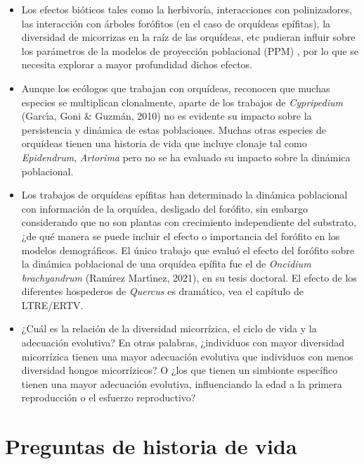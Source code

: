 \documentclass[
  12pt,
  letterpaper,
]{book}
\begin{document}
\begin{itemize}
  sobre orquídeas es un tema que merece atención. Por ejemplo ¿Cuál es
  el efecto de los patrones de variación abiótica sobre la persistencia
  de las poblaciones y su dinámica a largo plazo?
\item
  Los efectos bióticos tales como la herbivoría, interacciones con
  polinizadores, las interacción con árboles forófitos (en el caso de
  orquídeas epífitas), la diversidad de micorrizas en la raíz de las
  orquídeas, etc pudieran influir sobre los parámetros de la modelos de
  proyección poblacional (PPM) , por lo que se necesita explorar a mayor
  profundidad dichos efectos.
\item
  Aunque los ecólogos que trabajan con orquídeas, reconocen que muchas
  especies se multiplican clonalmente, aparte de los trabajos de
  \emph{Cypripedium} (Garcı́a, Goni \& Guzmán, 2010) no es evidente su
  impacto sobre la persistencia y dinámica de estas poblaciones. Muchas
  otras especies de orquídeas tienen una historia de vida que incluye
  clonaje tal como \emph{Epidendrum}, \emph{Artorima} pero no se ha
  evaluado su impacto sobre la dinámica poblacional.
\item
  Los trabajos de orquídeas epífitas han determinado la dinámica
  poblacional con información de la orquídea, desligado del forófito,
  sin embargo considerando que no son plantas con crecimiento
  independiente del substrato, ¿de qué manera se puede incluir el efecto
  o importancia del forófito en los modelos demográficos. El único
  trabajo que evaluó el efecto del forófito sobre la dinámica
  poblacional de una orquídea epífita fue el de \emph{Oncidium
  brachyandrum} (Ramı́rez Martı́nez, 2021), en su tesis doctoral. El
  efecto de los diferentes hospederos de \emph{Quercus} es dramático,
  vea el capítulo de LTRE/ERTV.
\item
  ¿Cuál es la relación de la diversidad micorrízica, el ciclo de vida y
  la adecuación evolutiva? En otras palabras, ¿individuos con mayor
  diversidad micorrízica tienen una mayor adecuación evolutiva que
  individuos con menos diversidad hongos micorrízicos? O ¿los que tienen
  un simbionte específico tienen una mayor adecuación evolutiva,
  influenciando la edad a la primera reproducción o el esfuerzo
  reproductivo?
\end{itemize}

\chapter{Preguntas de historia de
vida}\label{preguntas-de-historia-de-vida}
\end{document}
